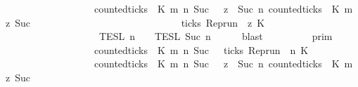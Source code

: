 \begin{isabellebody}
\ \ \ \ \ \ \ \ \ \ \ \ \ \ \ \ {\isasyminter}\ {\isacharbraceleft}{\isasymrho}{\isachardot}\ {\isacharparenleft}counted{\isacharunderscore}ticks\ {\isasymrho}\ K\ m\ n\ {\isacharparenleft}Suc\ {}{\isacharparenright}\ {\isasymor}\ {\isacharparenleft}{\isasymforall}z\ {\isasymge}\ Suc\ n{\isachardot}\ {\isacharparenleft}counted{\isacharunderscore}ticks\ {\isasymrho}\ K\ m\ z\ {\isacharparenleft}Suc\ {}{\isacharparenright}{\isacharparenright}\isanewline
\ \ \ \ \ \ \ \ \ \ \ \ \ \ \ \ \ \ \ \ \ \ \ \ \ \ \ \ {\isasymlongrightarrow}\ ticks\ {\isacharparenleft}{\isacharparenleft}Rep{\isacharunderscore}run\ {\isasymrho}{\isacharparenright}\ z\ K\ {\isacharbraceright}\isanewline
\ \ \ \ \ \ \ \ \ \ \ \ \ \ \ \ {\isasyminter}\ {\isasymlbrakk}{\isasymlbrakk}\ {\isasymPsi}\ {\isasymrbrakk}{\isasymrbrakk}\isactrlsub T\isactrlsub E\isactrlsub S\isactrlsub L\isactrlbsup {\isasymge}\ n\isactrlesup \ {\isasyminter}\ {\isasymlbrakk}{\isasymlbrakk}\ {\isasymPhi}\ {\isasymrbrakk}{\isasymrbrakk}\isactrlsub T\isactrlsub E\isactrlsub S\isactrlsub L\isactrlbsup {\isasymge}\ Suc\ n\isactrlesup {\isacartoucheclose}\isanewline
\ \ \ \ \isamarkupfalse%
\ blast\isanewline
\ \ \isamarkupfalse%
\ \isamarkupfalse%
\ {\isacartoucheopen}{\isachardot}{\isachardot}{\isachardot}\ {\isacharequal}\ {\isasymlbrakk}{\isasymlbrakk}\ {\isasymGamma}\ {\isasymrbrakk}{\isasymrbrakk}\isactrlsub p\isactrlsub r\isactrlsub i\isactrlsub m\ \isanewline
\ \ \ \ \ \ \ \ \ \ \ \ \ \ \ \ {\isasyminter}\ {\isacharbraceleft}{\isasymrho}{\isachardot}\ {\isacharparenleft}{\isasymnot}counted{\isacharunderscore}ticks\ {\isasymrho}\ K\ m\ n\ {\isacharparenleft}Suc\ {}{\isacharparenright}\ {\isasymor}\ ticks\ {\isacharparenleft}{\isacharparenleft}Rep{\isacharunderscore}run\ {\isasymrho}{\isacharparenright}\ n\ K\isanewline
\ \ \ \ \ \ \ \ \ \ \ \ \ \ \ \ {\isasyminter}\ {\isacharbraceleft}{\isasymrho}{\isachardot}\ {\isacharparenleft}counted{\isacharunderscore}ticks\ {\isasymrho}\ K\ m\ n\ {\isacharparenleft}Suc\ {}{\isacharparenright}\ {\isasymor}\ {\isacharparenleft}{\isasymforall}z\ {\isasymge}\ Suc\ n{\isachardot}\ {\isacharparenleft}counted{\isacharunderscore}ticks\ {\isasymrho}\ K\ m\ z\ {\isacharparenleft}Suc\ {}{\isacharparenright}{\isacharparenright}\isanewline

\end{isabellebody}
